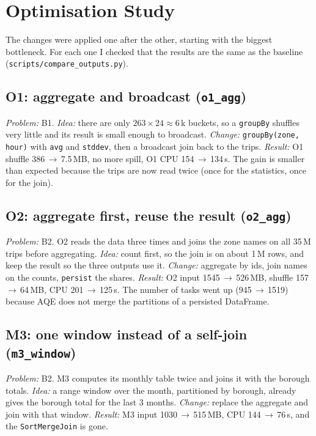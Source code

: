 \documentclass[sigconf]{acmart}
\begin{document}
\section{Optimisation Study}

The changes were applied one after the other, starting with the biggest
bottleneck. For each one I checked that the results are the same as the
baseline (\texttt{scripts/compare\_outputs.py}).

\subsection{O1: aggregate and broadcast (\texttt{o1\_agg})}
\emph{Problem:} B1. \emph{Idea:} there are only $263\times24\approx6$\,k
buckets, so a \texttt{groupBy} shuffles very little and its result is small
enough to broadcast. \emph{Change:} \texttt{groupBy(zone, hour)} with
\texttt{avg} and \texttt{stddev}, then a broadcast join back to the trips.
\emph{Result:} O1 shuffle 386\,$\to$\,7.5\,MB, no more spill, O1 CPU
154\,$\to$\,134\,s. The gain is smaller than expected because the trips are
now read twice (once for the statistics, once for the join).

\subsection{O2: aggregate first, reuse the result (\texttt{o2\_agg})}
\emph{Problem:} B2. O2 reads the data three times and joins the zone names on
all 35\,M trips before aggregating. \emph{Idea:} count first, so the join is
on about 1\,M rows, and keep the result so the three outputs use it.
\emph{Change:} aggregate by ids, join names on the counts, \texttt{persist}
the shares. \emph{Result:} O2 input 1545\,$\to$\,526\,MB, shuffle
157\,$\to$\,64\,MB, CPU 201\,$\to$\,125\,s. The number of tasks went up
(945\,$\to$\,1519) because AQE does not merge the partitions of a persisted
DataFrame.

\subsection{M3: one window instead of a self-join (\texttt{m3\_window})}
\emph{Problem:} B2. M3 computes its monthly table twice and joins it with the
borough totals. \emph{Idea:} a range window over the month, partitioned by
borough, already gives the borough total for the last 3 months.
\emph{Change:} replace the aggregate and join with that window.
\emph{Result:} M3 input 1030\,$\to$\,515\,MB, CPU 144\,$\to$\,76\,s, and the
\texttt{SortMergeJoin} is gone.
\end{document}
